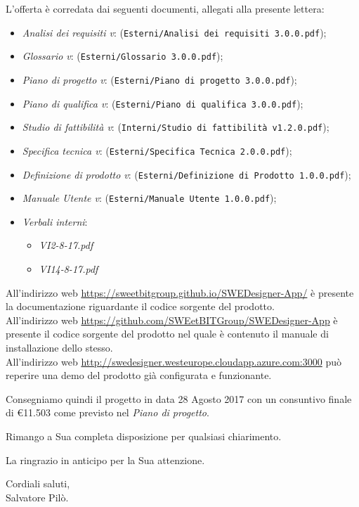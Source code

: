 	L'offerta è corredata dai seguenti documenti, allegati alla presente lettera:
	\begin{itemize}
		\item \emph{Analisi dei requisiti v\VersioneAR{}}: (\verb|Esterni/Analisi dei requisiti 3.0.0.pdf|);
		\item \emph{Glossario v\VersioneG{}}: (\verb|Esterni/Glossario 3.0.0.pdf|);
		\item \emph{Piano di progetto v\VersionePP{}}: (\verb|Esterni/Piano di progetto 3.0.0.pdf|);
		\item \emph{Piano di qualifica v\VersionePQ{}}: (\verb|Esterni/Piano di qualifica 3.0.0.pdf|);
		\item \emph{Studio di fattibilità v\VersioneSF{}}: (\verb|Interni/Studio di fattibilità v1.2.0.pdf|);
		\item \emph{Specifica tecnica v\VersioneST{}}: (\verb|Esterni/Specifica Tecnica 2.0.0.pdf|);
		\item \emph{Definizione di prodotto v\VersioneDP{}}: (\verb|Esterni/Definizione di Prodotto 1.0.0.pdf|);
		\item \emph{Manuale Utente v\VersioneMU{}}: (\verb|Esterni/Manuale Utente 1.0.0.pdf|);
		\item \emph{Verbali interni}:
		\begin{itemize}
			\item \emph{VI2-8-17.pdf}
			\item \emph{VI14-8-17.pdf}
		\end{itemize}
	\end{itemize}
	All'indirizzo web \url{https://sweetbitgroup.github.io/SWEDesigner-App/} è presente la documentazione riguardante il codice sorgente del prodotto.\\
	All'indirizzo web \url{https://github.com/SWEetBITGroup/SWEDesigner-App} è presente il codice sorgente del prodotto nel quale è contenuto il manuale
	di installazione dello stesso.\\
	All'indirizzo web \url{http://swedesigner.westeurope.cloudapp.azure.com:3000} può reperire una demo del prodotto già configurata e funzionante.

	Consegniamo quindi il progetto in data 28 Agosto 2017 con un consuntivo finale di \euro{11.503} come previsto nel \emph{Piano di progetto}.
	\begin{flushleft}
	\vspace{2cm}
		Rimango a Sua completa disposizione per qualsiasi chiarimento.
	\end{flushleft}
	\begin{flushleft}
		La ringrazio in anticipo per la Sua attenzione.
	\end{flushleft}
	\vspace{5mm}
	\begin{center}
		Cordiali saluti,\\
		\vspace{1cm}Salvatore Pilò.
	\end{center}

